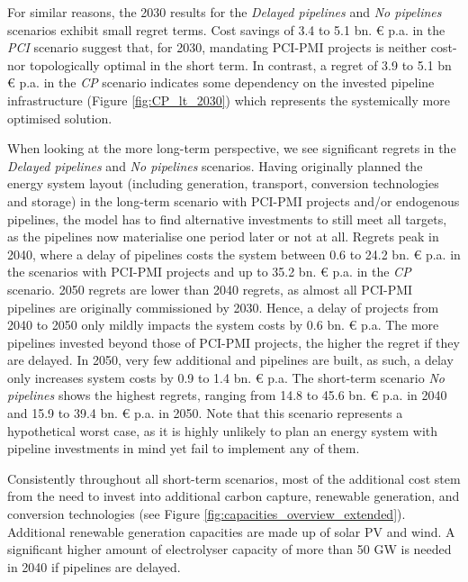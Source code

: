 \documentclass[final,5p,times,twocolumn,sort&compress]{elsarticle}
\begin{document}
For similar reasons, the 2030 results for the \textit{Delayed pipelines} and \textit{No pipelines} scenarios exhibit small regret terms. Cost savings of 3.4 to 5.1 bn. \euro{} p.a. in the \textit{PCI} scenario suggest that, for 2030, mandating PCI-PMI projects is neither cost- nor topologically optimal in the short term. In contrast, a regret of 3.9 to 5.1 bn \euro{} p.a. in the \textit{CP} scenario indicates some dependency on the invested pipeline infrastructure (Figure \ref{fig:CP_lt_2030}) which represents the systemically more optimised solution.

When looking at the more long-term perspective, we see significant regrets in the \textit{Delayed pipelines} and \textit{No pipelines} scenarios. Having originally planned the energy system layout (including generation, transport, conversion technologies and storage) in the long-term scenario with PCI-PMI projects and/or endogenous pipelines, the model has to find alternative investments to still meet all targets, as the pipelines now materialise one period later or not at all. Regrets peak in 2040, where a delay of pipelines costs the system between 0.6 to 24.2 bn. \euro{} p.a. in the scenarios with PCI-PMI projects and up to 35.2 bn. \euro{} p.a. in the \textit{CP} scenario. 2050 regrets are lower than 2040 regrets, as almost all PCI-PMI pipelines are originally commissioned by 2030. Hence, a delay of projects from 2040 to 2050 only mildly impacts the system costs by 0.6 bn. \euro{} p.a. The more pipelines invested beyond those of PCI-PMI projects, the higher the regret if they are delayed. In 2050, very few additional  and  pipelines are built, as such, a delay only increases system costs by 0.9 to 1.4 bn. \euro{} p.a. 
The short-term scenario \textit{No pipelines} shows the highest regrets, ranging from 14.8 to 45.6 bn. \euro{} p.a. in 2040 and 15.9 to 39.4 bn. \euro{} p.a. in 2050. Note that this scenario represents a hypothetical worst case, as it is highly unlikely to plan an energy system with pipeline investments in mind yet fail to implement any of them.

Consistently throughout all short-term scenarios, most of the additional cost stem from the need to invest into additional carbon capture, renewable generation, and conversion technologies (see Figure \ref{fig:capacities_overview_extended}). Additional renewable generation capacities are made up of solar PV and wind. A significant higher amount of electrolyser capacity of more than 50 GW is needed in 2040 if pipelines are delayed. 
\end{document}
